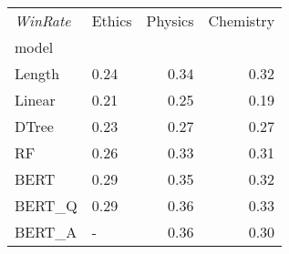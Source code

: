 \begin{tabular}{llrr}
\toprule
\textit{WinRate} & Ethics &  Physics &  Chemistry \\
model  &        &          &            \\
\midrule
Length &   0.24 &     0.34 &       0.32 \\
Linear &   0.21 &     0.25 &       0.19 \\
DTree  &   0.23 &     0.27 &       0.27 \\
RF     &   0.26 &     0.33 &       0.31 \\
BERT   &   0.29 &     0.35 &       0.32 \\
BERT\_Q &   0.29 &     0.36 &       0.33 \\
BERT\_A &      - &     0.36 &       0.30 \\
\bottomrule
\end{tabular}
